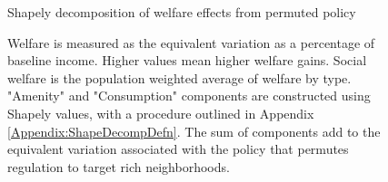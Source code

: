 \documentclass[12pt]{article}
\begin{document}
	
	
		\begin{figure}[htbp!]
		
		\caption{Shapely decomposition of welfare effects from permuted policy}\label{figure:WelfareDecomp_optPolicy}
		
		\caption*{Welfare is measured as the equivalent variation as a percentage of baseline income. Higher values mean higher welfare gains. Social welfare is the population weighted average of welfare by type. "Amenity" and "Consumption" components are constructed using Shapely values, with a procedure outlined in Appendix \ref{Appendix:ShapeDecompDefn}. The sum of components add to the equivalent variation associated with the policy that permutes regulation to target rich neighborhoods.}
		
	\end{figure}
	
	
	
\end{document}
